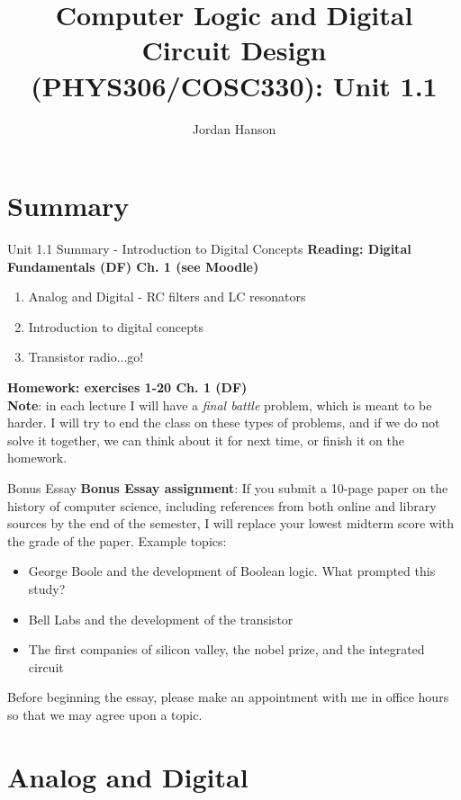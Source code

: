 \documentclass{beamer}
\title{Computer Logic and Digital Circuit Design (PHYS306/COSC330): Unit 1.1}
\author{Jordan Hanson}
\institute{Whittier College Department of Physics and Astronomy}
\begin{document}
\maketitle

\section{Summary}

\begin{frame}{Unit 1.1 Summary - Introduction to Digital Concepts}
\textbf{Reading: Digital Fundamentals (DF) Ch. 1 (see Moodle)}
\begin{enumerate}
\item Analog and Digital - RC filters and LC resonators
\item Introduction to digital concepts
\item Transistor radio...go!
\end{enumerate}
\textbf{Homework: exercises 1-20 Ch. 1 (DF)} \\
\textbf{Note}: in each lecture I will have a \textit{final battle} problem, which is meant to be harder.  I will try to end the class on these types of problems, and if we do not solve it together, we can think about it for next time, or finish it on the homework.
\end{frame}

\begin{frame}{Bonus Essay}
\small
\textbf{\alert{Bonus Essay assignment}}: If you submit a 10-page paper on the history of computer science, including references from both online and library sources by the end of the semester, I will replace your lowest midterm score with the grade of the paper.  Example topics:
\begin{itemize}
\item George Boole and the development of Boolean logic.  What prompted this study?
\item Bell Labs and the development of the transistor
\item The first companies of silicon valley, the nobel prize, and the integrated circuit
\end{itemize}
Before beginning the essay, please make an appointment with me in office hours so that we may agree upon a topic.
\end{frame}

\section{Analog and Digital}
\end{document}
